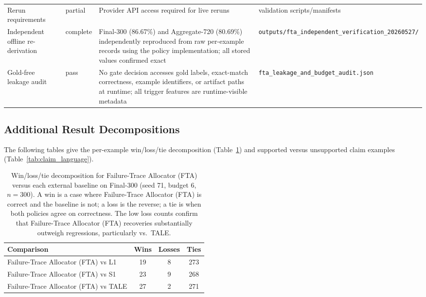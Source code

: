 \documentclass[smallcondensed]{svjour3}
\begin{document}
\begin{table}[H]
{\begin{tabular}{p{}p{}p{}p{}}
Rerun requirements & partial & Provider API access required for live reruns & validation scripts/manifests \\
Independent offline re-derivation & complete & Final-300 (86.67\%) and Aggregate-720 (80.69\%) independently reproduced from raw per-example records using the policy implementation; all stored values confirmed exact & \texttt{outputs/fta\allowbreak\_independent\allowbreak\_verification\allowbreak\_20260527/} \\
Gold-free leakage audit & pass & No gate decision accesses gold labels, exact-match correctness, example identifiers, or artifact paths at runtime; all trigger features are runtime-visible metadata & \texttt{fta\allowbreak\_leakage\allowbreak\_and\allowbreak\_budget\allowbreak\_audit.json} \\
\bottomrule
\end{tabular}}
\end{table}

\clearpage
\subsection*{Additional Result Decompositions}

The following tables give the per-example win/loss/tie decomposition
(Table~\ref{tab:wlt}) and supported versus unsupported claim examples
(Table~\ref{tab:claim_language}).

\begin{table}[H]
\centering
\caption{Win/loss/tie decomposition for Failure-Trace Allocator (FTA) versus each external baseline on
Final-300 (seed 71, budget 6, $n=300$). A win is a case where Failure-Trace Allocator (FTA) is correct
and the baseline is not; a loss is the reverse; a tie is when both policies agree on
correctness. The low loss counts confirm that Failure-Trace Allocator (FTA) recoveries substantially
outweigh regressions, particularly vs.\ TALE.}
\label{tab:wlt}
\small
\begin{tabular}{lccc}
\toprule
Comparison & Wins & Losses & Ties \\
\midrule
Failure-Trace Allocator (FTA) vs L1   & 19 & 8 & 273 \\
Failure-Trace Allocator (FTA) vs S1   & 23 & 9 & 268 \\
Failure-Trace Allocator (FTA) vs TALE & 27 & 2 & 271 \\
\bottomrule
\end{tabular}
\end{table}
\end{document}
